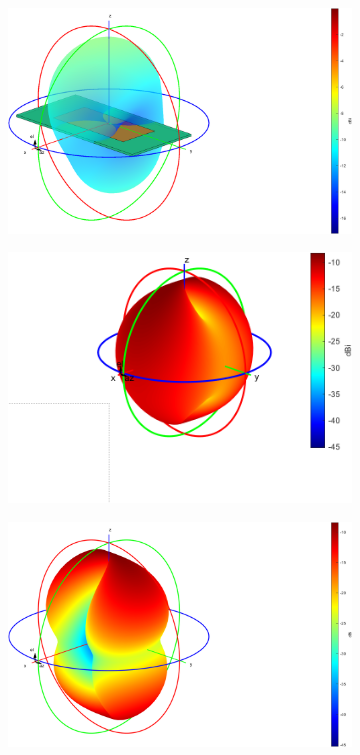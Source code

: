 \documentclass{ieeeojies}
\begin{document}
\begin{center}
	\begin{figure}[t]
			\begin{subfigure}[t]{0.32\textwidth}
		\includegraphics[width = \linewidth]{gain_patch.png}
				\subcaption{}
	\end{subfigure}
	\begin{subfigure}[t]{0.32\textwidth}
		\includegraphics[width = \linewidth]{gain_patch_v.png}
						\subcaption{}
	\end{subfigure}
	\begin{subfigure}[t]{0.32\textwidth}
		\includegraphics[width = \linewidth]{gain_patch_h.png}

\end{subfigure}
\end{figure}
\end{center}
\end{document}
